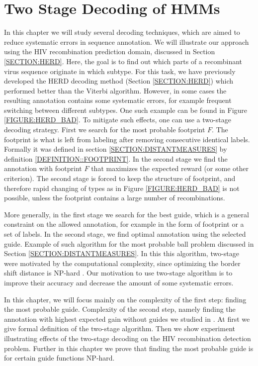 \chapter{Two Stage Decoding of HMMs}\label{CHAPTER:TWOSTAGE}

In this chapter we will study several decoding techniques, which are aimed to
reduce systematic errors in sequence annotation.  We will illustrate our
approach using the HIV recombination prediction domain, discussed in Section
\ref{SECTION:HERD}. Here, the goal is to find out which parts of a recombinant
virus sequence originate in which subtype.  For this task, we have previously
developed the HERD decoding method \cite{Nanasi2010, Nanasi2010mgr} (Section
\ref{SECTION:HERD}) which performed better than the Viterbi algorithm. However,
in some cases the resulting annotation contains some systematic errors, for
example frequent switching between different subtypes. One such example can be
found in Figure \ref{FIGURE:HERD_BAD}. To mitigate such effects, one can use a
two-stage decoding strategy. First we search for the most probable footprint
$F$. The footprint is what is left from labeling after removing consecutive
identical labels. Formally it was defined in section
\ref{SECTION:DISTANTMEASURES} by definition \ref{DEFINITION::FOOTPRINT}. In the
second stage we find the annotation with footprint $F$ that maximizes the
expected reward (or some other criterion). The second stage is forced to keep the
structure of footprint, and therefore rapid changing of types as in Figure
\ref{FIGURE:HERD_BAD} is not possible, unless the footprint contains a large
number of recombinations. 

More generally, in the first stage we search for the best guide, which is a
general constraint on the allowed annotation, for example in the form of
footprint or a set of labels. In the second stage, we find optimal annotation
using the selected guide. Example of such algorithm for the most probable ball
problem \cite{Brown2010, Truszkowski2011} discussed in Section
\ref{SECTION:DISTANTMEASURES}. In this this algorithm, two-stage were motivated
by the computational complexity, since optimizing the border shift distance is
NP-hard \cite{Brown2010}. Our motivation to use two-stage algorithm is to
improve their accuracy and decrease the amount of some systematic errors. 

In this chapter, we will focus mainly on the complexity of the first step:
finding the most probable guide. Complexity of the second step, namely finding
the annotation with highest expected gain without guides we studied in
\cite{Nanasi2010, Nanasi2010mgr}.  At first we give formal definition of the
two-stage algorithm. Then we show experiment illustrating effects of the
two-stage decoding on the HIV recombination detection problem. Further in this
chapter we prove that finding the most probable guide is for certain guide
functions NP-hard.



